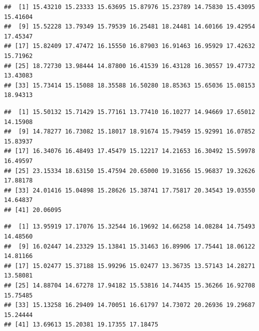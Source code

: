 \documentclass[
  12pt,
]{book}
\newenvironment{Shaded}{\begin{snugshade}}{\end{snugshade}}
\newcommand{\DecValTok}[1]{\textcolor[rgb]{0.00,0.00,0.81}{#1}}
\newcommand{\DocumentationTok}[1]{\textcolor[rgb]{0.56,0.35,0.01}{\textbf{\textit{#1}}}}
\newcommand{\NormalTok}[1]{#1}
\newcommand{\SpecialCharTok}[1]{\textcolor[rgb]{0.00,0.00,0.00}{#1}}
\begin{document}
\begin{verbatim}
##  [1] 15.43210 15.23333 15.63695 15.87976 15.23789 14.75830 15.43095 15.41604
##  [9] 15.52228 13.79349 15.79539 16.25481 18.24481 14.60166 19.42954 17.45347
## [17] 15.82409 17.47472 16.15550 16.87903 16.91463 16.95929 17.42632 15.71962
## [25] 18.72730 13.98444 14.87800 16.41539 16.43128 16.30557 19.47732 13.43083
## [33] 15.73414 15.15088 18.35588 16.50280 18.85363 15.65036 15.08153 18.94313
\end{verbatim}

\begin{Shaded}
\end{Shaded}

\begin{verbatim}
##  [1] 15.50132 15.71429 15.77161 13.77410 16.10277 14.94669 17.65012 14.15908
##  [9] 14.78277 16.73082 15.18017 18.91674 15.79459 15.92991 16.07852 15.83937
## [17] 16.34076 16.48493 17.45479 15.12217 14.21653 16.30492 15.59978 16.49597
## [25] 23.15334 18.63150 15.47594 20.65000 19.31656 15.96837 19.32626 17.88178
## [33] 24.01416 15.04898 15.28626 15.38741 17.75817 20.34543 19.03550 14.64837
## [41] 20.06095
\end{verbatim}

\begin{Shaded}
\end{Shaded}

\begin{verbatim}
##  [1] 13.95919 17.17076 15.32544 16.19692 14.66258 14.08284 14.75493 14.48560
##  [9] 16.02447 14.23329 15.13841 15.31463 16.89906 17.75441 18.06122 14.81166
## [17] 15.02477 15.37188 15.99296 15.02477 13.36735 13.57143 14.28271 13.58081
## [25] 14.88704 14.67278 17.94182 15.53816 14.74435 15.36266 16.92708 15.75485
## [33] 15.13258 16.29409 14.70051 16.61797 14.73072 20.26936 19.29687 15.24444
## [41] 13.69613 15.20381 19.17355 17.18475
\end{verbatim}
\end{document}
